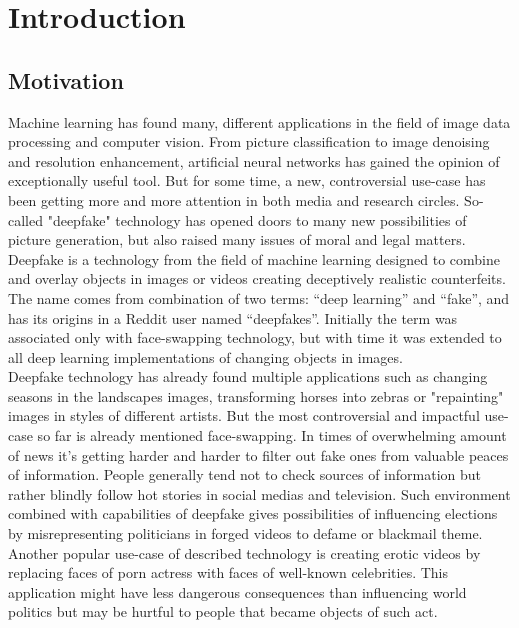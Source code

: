 \chapter{Introduction}
\section{Motivation}
Machine learning has found many, different applications in the field of image data processing and computer vision. From picture classification to image denoising and resolution enhancement, artificial neural networks has gained the opinion of exceptionally useful tool. But for some time, a new, controversial use-case has been getting more and more attention in both media and research circles. So-called "deepfake" technology has opened doors to many new possibilities of picture generation, but also raised many issues of moral and legal matters.\\

Deepfake is a technology from the field of machine learning designed to combine and overlay objects in images or videos creating deceptively realistic counterfeits. The name comes from combination of two terms: ``deep learning'' and ``fake'', and has its origins in a Reddit user named ``deepfakes''. Initially the term was associated only with face-swapping technology, but with time it was extended to all deep learning implementations of changing objects in images.\\

Deepfake technology has already found multiple applications such as changing seasons in the landscapes images, transforming horses into zebras or "repainting" images in styles of different artists. But the most controversial and impactful use-case so far is already mentioned face-swapping. In times of overwhelming amount of news it's getting harder and harder to filter out fake ones from valuable peaces of information. People generally tend not to check sources of information but rather blindly follow hot stories in social medias and television. Such environment combined with capabilities of deepfake gives possibilities of influencing elections by misrepresenting politicians in forged videos to defame or blackmail theme. Another popular use-case of described technology is creating erotic videos by replacing faces of porn actress with faces of well-known celebrities. This application might have less dangerous consequences than influencing world politics but may be hurtful to people that became objects of such act.\\

